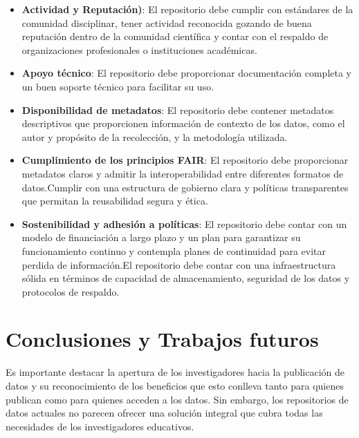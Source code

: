 \documentclass[runningheads]{llncs}
\begin{document}
\begin{itemize}
    \item \textbf{Actividad y Reputación)}: El repositorio debe cumplir con estándares de la comunidad disciplinar, tener actividad reconocida  gozando de buena reputación dentro de la comunidad científica y contar con el respaldo de organizaciones profesionales o instituciones académicas.
    \item \textbf{Apoyo técnico}: El repositorio debe proporcionar documentación completa y un buen soporte técnico para facilitar su uso.
    \item \textbf{Disponibilidad de metadatos}:  El repositorio debe contener metadatos descriptivos que proporcionen información de contexto de los datos, como el autor y propósito de la recolección, y la metodología utilizada. 
    \item \textbf{Cumplimiento de los principios FAIR}: El repositorio debe proporcionar metadatos claros y admitir la interoperabilidad entre diferentes formatos de datos.Cumplir  con una estructura de gobierno clara y políticas transparentes que permitan la reusabilidad segura y ética.
    \item \textbf{Sostenibilidad y adhesión a políticas}: El repositorio debe contar con un modelo de financiación a largo plazo y un plan para garantizar su funcionamiento continuo y contempla planes de continuidad para evitar perdida de información.El repositorio debe contar con una infraestructura sólida en términos de capacidad de almacenamiento, seguridad de los datos y protocolos de respaldo.
\end{itemize}

\section{Conclusiones y Trabajos futuros}

Es importante destacar la apertura de los investigadores hacia la publicación de datos y su reconocimiento de los beneficios que esto conlleva tanto para quienes publican como para quienes acceden a los datos. Sin embargo, los repositorios de datos actuales no parecen ofrecer una solución integral que cubra todas las necesidades de los investigadores educativos. \\
\end{document}
